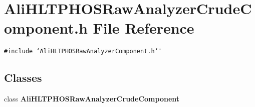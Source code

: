 \section{Ali\-HLTPHOSRaw\-Analyzer\-Crude\-Component.h File Reference}
\label{AliHLTPHOSRawAnalyzerCrudeComponent_8h}


{\tt \#include \char`\"{}Ali\-HLTPHOSRaw\-Analyzer\-Component.h\char`\"{}}\par
\subsection*{Classes}
\begin{CompactItemize}
\item 
class {\bf Ali\-HLTPHOSRaw\-Analyzer\-Crude\-Component}
\end{CompactItemize}
